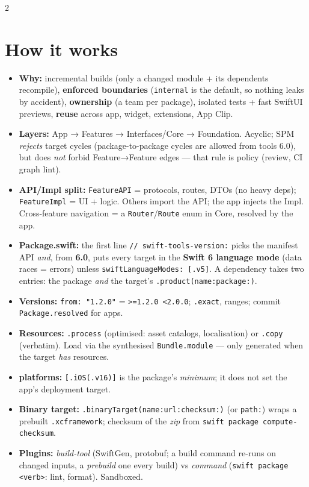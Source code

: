 \documentclass[8pt]{extarticle}
\begin{document}
\begin{multicols}{2}
\raggedright

\section{How it works}
\begin{itemize}
  \item \textbf{Why:} incremental builds (only a changed module + its dependents recompile),
        \textbf{enforced boundaries} (\texttt{internal} is the default, so nothing leaks
        by accident), \textbf{ownership} (a team per package), isolated tests + fast
        SwiftUI previews, \textbf{reuse} across app, widget, extensions, App Clip.
  \item \textbf{Layers:} App → Features → Interfaces/Core → Foundation. Acyclic;
        SPM \emph{rejects} target cycles (package-to-package cycles are allowed from
        tools 6.0), but does \emph{not} forbid Feature→Feature edges — that rule is
        policy (review, CI graph lint).
  \item \textbf{API/Impl split:} \texttt{FeatureAPI} = protocols, routes, DTOs (no heavy
        deps); \texttt{FeatureImpl} = UI + logic. Others import the API; the app injects
        the Impl. Cross-feature navigation = a \texttt{Router}/\texttt{Route} enum in Core,
        resolved by the app.
  \item \textbf{Package.swift:} the first line \texttt{// swift-tools-version:} picks the
        manifest API \emph{and}, from \textbf{6.0}, puts every target in the \textbf{Swift 6
        language mode} (data races = errors) unless \texttt{swiftLanguageModes: [.v5]}.
        A dependency takes two entries: the package \emph{and} the target's
        \texttt{.product(name:package:)}.
  \item \textbf{Versions:} \texttt{from: "1.2.0"} = \texttt{>=1.2.0 <2.0.0};
        \texttt{.exact}, ranges; commit \texttt{Package.resolved} for apps.
  \item \textbf{Resources:} \texttt{.process} (optimised: asset catalogs, localisation)
        or \texttt{.copy} (verbatim). Load via the synthesised \texttt{Bundle.module} —
        only generated when the target \emph{has} resources.
  \item \textbf{platforms:} \texttt{[.iOS(.v16)]} is the package's \emph{minimum};
        it does not set the app's deployment target.
  \item \textbf{Binary target:} \texttt{.binaryTarget(name:url:checksum:)} (or
        \texttt{path:}) wraps a prebuilt \texttt{.xcframework}; checksum of the
        \emph{zip} from \texttt{swift package compute-checksum}.
  \item \textbf{Plugins:} \emph{build-tool} (SwiftGen, protobuf; a build command re-runs on changed inputs, a \emph{prebuild} one every build) vs
        \emph{command} (\texttt{swift package <verb>}: lint, format). Sandboxed.
\end{itemize}


\end{multicols}
\end{document}
